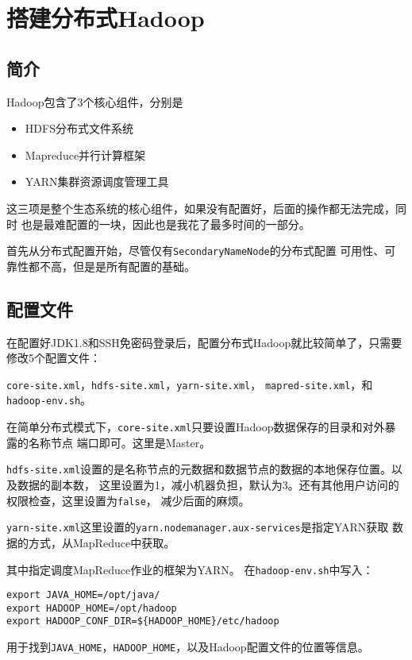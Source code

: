 
\section{搭建分布式Hadoop}
\label{sec:hadoop_install}
\subsection{简介}
Hadoop包含了3个核心组件，分别是
\begin{itemize}
	\item HDFS分布式文件系统
	\item Mapreduce并行计算框架
	\item YARN集群资源调度管理工具
\end{itemize}
这三项是整个生态系统的核心组件，如果没有配置好，后面的操作都无法完成，同时
也是最难配置的一块，因此也是我花了最多时间的一部分。

首先从分布式配置开始，尽管仅有\lstinline{SecondaryNameNode}的分布式配置
可用性、可靠性都不高，但是是所有配置的基础。

\subsection{配置文件}

在配置好JDK1.8和SSH免密码登录后，配置分布式Hadoop就比较简单了，只需要修改5个配置文件：

\lstinline{core-site.xml}，\lstinline{hdfs-site.xml}，\lstinline{yarn-site.xml}，
\lstinline{mapred-site.xml}，和\lstinline{hadoop-env.sh}。

在简单分布式模式下，\lstinline{core-site.xml}只要设置Hadoop数据保存的目录和对外暴露的名称节点
端口即可。这里是Master。

\lstinline{hdfs-site.xml}设置的是名称节点的元数据和数据节点的数据的本地保存位置。以及数据的副本数，
这里设置为1，减小机器负担，默认为3。还有其他用户访问的权限检查，这里设置为\lstinline{false}，
减少后面的麻烦。

\lstinline{yarn-site.xml}这里设置的\lstinline{yarn.nodemanager.aux-services}是指定YARN获取
数据的方式，从MapReduce中获取。

其中指定调度MapReduce作业的框架为YARN。
在\lstinline{hadoop-env.sh}中写入：
\begin{lstlisting}[title=hadoop-env.sh, style=mysh]
export JAVA_HOME=/opt/java/
export HADOOP_HOME=/opt/hadoop
export HADOOP_CONF_DIR=${HADOOP_HOME}/etc/hadoop
\end{lstlisting}
用于找到\lstinline{JAVA_HOME}，\lstinline{HADOOP_HOME}，以及Hadoop配置文件的位置等信息。
